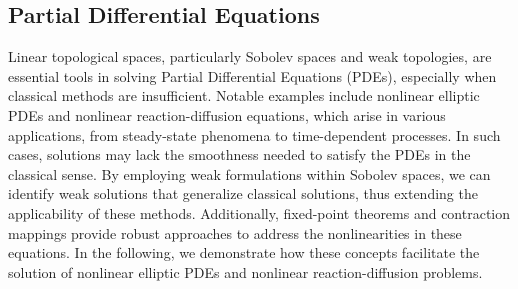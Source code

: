 \documentclass[12pt, reqno]{amsart}
\theoremstyle{definition}
\numberwithin{equation}{section}
\begin{document}
\begin{comment}
Since $X$ is complete, there exists some $x^* \in X$ such that $x_n \to x^*$. Taking the limit as $n \to \infty$ in the equation $x_{n+1} = f(x_n)$, and using the continuity of $f$, we get:
\[
x^* = \lim_{n \to \infty} x_{n+1} = \lim_{n \to \infty} f(x_n) = f\left(\lim_{n \to \infty} x_n\right) = f(x^*).
\]
Hence, $x^*$ is a fixed point of $f$. To show uniqueness, suppose $y^*$ is another fixed point of $f$. Then,
\[
d(x^*, y^*) = d(f(x^*), f(y^*)) \leq c \cdot d(x^*, y^*).
\]
If $x^* \neq y^*$, then $d(x^*, y^*) > 0$, but this would imply $d(x^*, y^*) \leq c \cdot d(x^*, y^*) < d(x^*, y^*)$, a contradiction. Therefore, $x^* = y^*$.
\end{proof}

The Fixed Point Theorem plays a crucial role in various fields, including partial differential equations (PDEs), numerical analysis, and linear programming. In PDEs, it helps establish the existence of solutions by ensuring that certain operators have fixed points, which correspond to the solutions of the equations. In numerical methods, fixed point iteration techniques are commonly employed to approximate solutions to nonlinear systems. Additionally, in linear programming, the Fixed Point Theorem supports optimization algorithms, particularly those that require iterative processes to converge to optimal solutions. In the next section, we investigate further into those applications.
\vfill
\pagebreak
\end{comment}

\subsection{Partial Differential Equations}
Linear topological spaces, particularly Sobolev spaces and weak topologies, are essential tools in solving Partial Differential Equations (PDEs), especially when classical methods are insufficient. Notable examples include nonlinear elliptic PDEs and nonlinear reaction-diffusion equations, which arise in various applications, from steady-state phenomena to time-dependent processes. In such cases, solutions may lack the smoothness needed to satisfy the PDEs in the classical sense. By employing weak formulations within Sobolev spaces, we can identify weak solutions that generalize classical solutions, thus extending the applicability of these methods. Additionally, fixed-point theorems and contraction mappings provide robust approaches to address the nonlinearities in these equations. In the following, we demonstrate how these concepts facilitate the solution of nonlinear elliptic PDEs and nonlinear reaction-diffusion problems.
\end{document}
